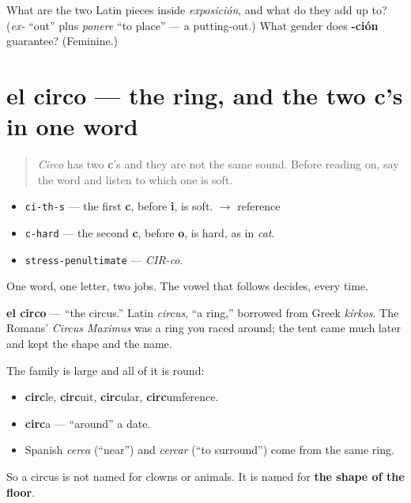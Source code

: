 \begin{tcolorbox}[breakable,colback=teal!4,colframe=teal!35!black,title={Before you move on}]
What are the two Latin pieces inside \emph{exposición}, and what do they add up to? (\emph{ex-} \textquotedblleft{}out\textquotedblright{} plus \emph{ponere} \textquotedblleft{}to place\textquotedblright{} — a putting-out.) What gender does \textbf{-ción} guarantee? (Feminine.)
\end{tcolorbox}
\section[el circo]{el circo — the ring, and the two c's in one word}

\label{lesson:ES-C420-circo}



\begin{quote}
\emph{Circo} has two \textbf{c}'s and they are not the same sound. Before reading on, say the word and listen to which one is soft.
\end{quote}

\begin{sounds}
\begin{itemize}
\raggedright
  \item \texttt{ci-th-s} — the first \textbf{c}, before \textbf{i}, is soft. $\to$ reference
  \item \texttt{c-hard} — the second \textbf{c}, before \textbf{o}, is hard, as in \emph{cat}.
  \item \texttt{stress-penultimate} — \emph{CIR-co}.
\end{itemize}

One word, one letter, two jobs. The vowel that follows decides, every time.
\end{sounds}

\begin{cousinweb}
\textbf{el circo} — \textquotedblleft{}the circus.\textquotedblright{} Latin \emph{circus}, \textquotedblleft{}a ring,\textquotedblright{} borrowed from Greek \emph{kírkos}. The Romans' \emph{Circus Maximus} was a ring you raced around; the tent came much later and kept the shape and the name.

The family is large and all of it is round:

\begin{itemize}
\raggedright
  \item \textbf{circ}le, \textbf{circ}uit, \textbf{circ}ular, \textbf{circ}umference.
  \item \textbf{circ}a — \textquotedblleft{}around\textquotedblright{} a date.
  \item Spanish \emph{cerca} (\textquotedblleft{}near\textquotedblright{}) and \emph{cercar} (\textquotedblleft{}to surround\textquotedblright{}) come from the same ring.
\end{itemize}

So a circus is not named for clowns or animals. It is named for \textbf{the shape of the floor}.
\end{cousinweb}

